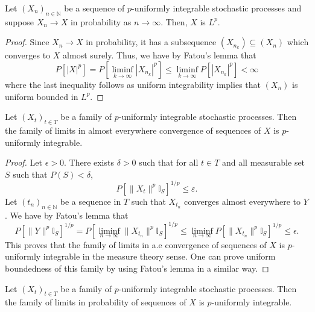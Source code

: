 \begin{lemma}\label{lem:memLp_of_tendstoInMeasure}
  Let $(X_n)_{n \in \mathbb{N}}$ be a sequence of $p$-uniformly integrable stochastic processes and suppose $X_n \to X$
  in probability as $n \to \infty$. Then, $X$ is $L^p$.
\end{lemma}

\begin{proof}
  Since $X_n \to X$ in probability, it has a subsequence $(X_{n_k}) \subseteq (X_n)$ which converges
  to $X$ almost surely. Thus, we have by Fatou's lemma that
  \[P[|X|^p] = P[\liminf_{k \to \infty} |X_{n_k}|^p] \le \liminf_{k \to \infty} P[|X_{n_k}|^p] < \infty\]
  where the last inequality follows as uniform integrability implies that $(X_n)$ is uniform bounded in $L^p$.
\end{proof}

\begin{lemma}\label{lem:uniformIntegrable_of_tendsto_ae}
  Let $(X_t)_{t \in T}$ be a family of $p$-uniformly integrable stochastic processes. Then the family of limits in almost everywhere convergence of sequences of $X$ is $p$-uniformly integrable.
\end{lemma}

\begin{proof}
  Let $\epsilon > 0$. There exists $\delta > 0$ such that for all $t\in T$ and all measurable set $S$ such that $P(S)<\delta$,
  \[P[\|X_t\|^p\mathbb{I}_S]^{1/p}\le \varepsilon.\]
  Let $(t_n)_{n \in \mathbb{N}}$ be a sequence in $T$ such that $X_{t_n}$ converges almost everywhere to $Y$. We have by Fatou's lemma that
  \[P[\|Y\|^p \mathbb{I}_{S}]^{1/p} = P[\liminf_{n \to \infty} \|X_{t_{n}}\|^p \mathbb{I}_{S}]^{1/p} \le \liminf_{n \to \infty} P[\|X_{t_{n}}\|^p \mathbb{I}_{S}]^{1/p} \le \epsilon.\]
  This proves that the family of limits in a.e convergence of sequences of $X$ is $p$-uniformly integrable in the measure theory sense. One can prove uniform boundedness of this family by using Fatou's lemma in a similar way.
\end{proof}

\begin{lemma}\label{lem:uniformIntegrable_of_tendstoInMeasure}
  Let $(X_t)_{t \in T}$ be a family of $p$-uniformly integrable stochastic processes. Then the family of limits in probability of sequences of $X$ is $p$-uniformly integrable.
\end{lemma}

